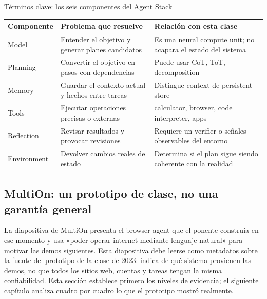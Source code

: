 \documentclass[a4paper]{article}
\begin{document}
\begin{knowledgebox}{Términos clave: los seis componentes del Agent Stack}
\begin{tabularx}{\textwidth}{L{0.18\textwidth}>{\raggedright\arraybackslash}X >{\raggedright\arraybackslash}X}
\toprule
Componente & Problema que resuelve & Relación con esta clase \\
\midrule
Model & Entender el objetivo y generar planes candidatos & Es una neural compute unit; no acapara el estado del sistema \\
Planning & Convertir el objetivo en pasos con dependencias & Puede usar CoT, ToT, decomposition \\
Memory & Guardar el contexto actual y hechos entre tareas & Distingue context de persistent store \\
Tools & Ejecutar operaciones precisas o externas & calculator, browser, code interpreter, apps \\
Reflection & Revisar resultados y provocar revisiones & Requiere un verifier o señales observables del entorno \\
Environment & Devolver cambios reales de estado & Determina si el plan sigue siendo coherente con la realidad \\
\bottomrule
\end{tabularx}
\end{knowledgebox}


\subsection{MultiOn: un prototipo de clase, no una garantía general}

La diapositiva de MultiOn presenta el browser agent que el ponente construía en ese momento y usa «poder operar internet mediante lenguaje natural» para motivar las demos siguientes. Esta diapositiva debe leerse como metadatos sobre la fuente del prototipo de la clase de 2023: indica de qué sistema provienen las demos, no que todos los sitios web, cuentas y tareas tengan la misma confiabilidad. Esta sección establece primero los niveles de evidencia; el siguiente capítulo analiza cuadro por cuadro lo que el prototipo mostró realmente.
\end{document}
